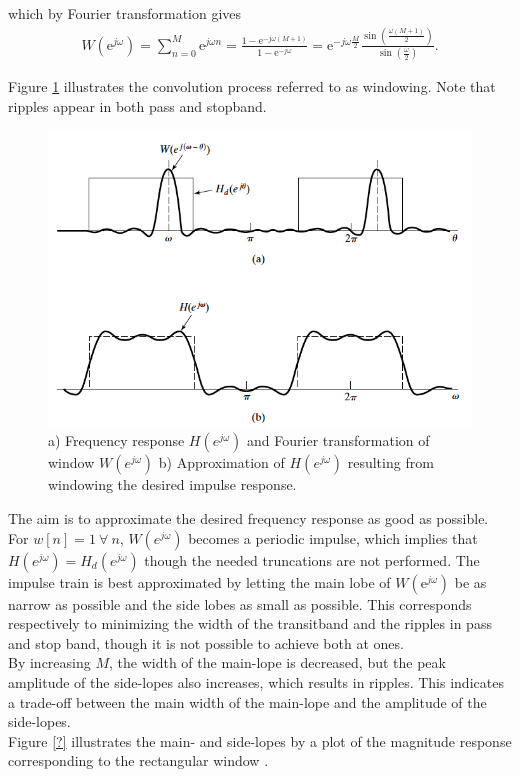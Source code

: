 which by Fourier transformation gives 
\begin{align}
W \left(\text{e}^{j\omega}\right)=\sum_{n=0}^{M} \text{e}^{j\omega n} = \frac{1- \text{e}^{-j\omega(M+1)}}{1- \text{e}^{-j\omega}} = \text{e}^{-j\omega \frac{M}{2}} \frac{ \sin \left( \frac{\omega \left( M+1 \right)}{2} \right)}{\sin \left( \frac{\omega}{2} \right)}.
\end{align}

Figure \ref{fig:FIR1} illustrates the convolution process referred to as windowing. Note that ripples appear in both pass and stopband.

\begin{figure}[H]
    \centering
    \includegraphics[scale=0.4]{figures/FIR1.png}
    \caption{a) Frequency response $H(e^{j\omega})$ and Fourier transformation of window $W(e^{j\omega})$ b) Approximation of $H(e^{j\omega})$ resulting from windowing the desired impulse response.}
    \label{fig:FIR1}
\end{figure}

The aim is to approximate the desired frequency response as good as possible. For $w[n]=1 \ \forall \ n$, $W(e^{j\omega})$ becomes a periodic impulse, which implies that $H(e^{j\omega}) = H_d(e^{j\omega})$ though the needed truncations are not performed. The impulse train is best approximated by letting the main lobe of $W(\text{e}^{j\omega})$ be as narrow as possible and the side lobes as small as possible. This corresponds respectively to minimizing the width of the transitband and the ripples in pass and stop band, though it is not possible to achieve both at ones.\\
By increasing $M$, the width of the main-lope is decreased, but the peak amplitude of the side-lopes also increases, which results in ripples. This indicates a trade-off between the main width of the main-lope and the amplitude of the side-lopes. \\
Figure \ref{?} illustrates the main- and side-lopes by a plot of the magnitude response corresponding to the rectangular window .

